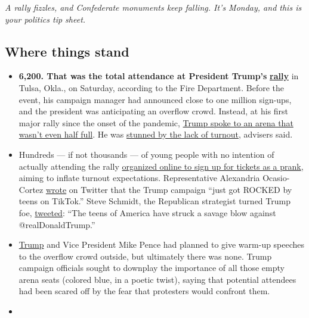 \emph{A rally fizzles, and Confederate monuments keep falling. It's
Monday, and this is your politics tip sheet.}

\hypertarget{where-things-stand}{%
\subsection{Where things stand}\label{where-things-stand}}

\begin{itemize}
\item
  \textbf{6,200. That was the total attendance at President Trump's}
  \textbf{\href{https://www.nytimes3xbfgragh.onion/2020/07/08/us/politics/trump-rally-portsmouth-new-hampshire.html}{rally}}
  in Tulsa, Okla., on Saturday, according to the Fire Department. Before
  the event, his campaign manager had announced close to one million
  sign-ups, and the president was anticipating an overflow crowd.
  Instead, at his first major rally since the onset of the pandemic,
  \href{https://www.nytimes3xbfgragh.onion/2020/06/20/us/politics/tulsa-trump-rally.html}{Trump
  spoke to an arena that wasn't even half full}. He was
  \href{https://www.nytimes3xbfgragh.onion/2020/06/21/us/politics/trump-tulsa-rally.html}{stunned
  by the lack of turnout}, advisers said.
\item
  Hundreds --- if not thousands --- of young people with no intention of
  actually attending the rally
  \href{https://www.nytimes3xbfgragh.onion/2020/06/21/style/tiktok-trump-rally-tulsa.html}{organized
  online to sign up for tickets as a prank}, aiming to inflate turnout
  expectations. Representative Alexandria Ocasio-Cortez
  \href{https://twitter.com/AOC/status/1274499021625794565?s=20}{wrote}
  on Twitter that the Trump campaign ``just got ROCKED by teens on
  TikTok.'' Steve Schmidt, the Republican strategist turned Trump foe,
  \href{https://twitter.com/SteveSchmidtSES/status/1274486428160811009}{tweeted}:
  ``The teens of America have struck a savage blow against
  @realDonaldTrump.''
\item
  \href{https://www.nytimes3xbfgragh.onion/2020/06/22/style/trump-tulsa-tie.html}{Trump}
  and Vice President Mike Pence had planned to give warm-up speeches to
  the overflow crowd outside, but ultimately there was none. Trump
  campaign officials sought to downplay the importance of all those
  empty arena seats (colored blue, in a poetic twist), saying that
  potential attendees had been scared off by the fear that protesters
  would confront them.
\item

\end{itemize}
